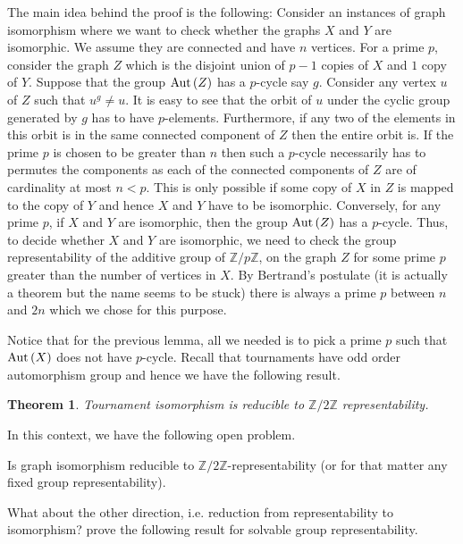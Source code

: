 \documentclass{article}
\newtheorem{theorem}{Theorem}[section]
\begin{document}
The main idea behind the proof is the following: Consider an instances
of graph isomorphism where we want to check whether the graphs $X$ and
$Y$ are isomorphic. We assume they are connected and have $n$
vertices. For a prime $p$, consider the graph $Z$ which is the
disjoint union of $p-1$ copies of $X$ and $1$ copy of $Y$. Suppose
that the group $\mathrm{Aut}\left(Z\right)$ has a $p$-cycle say $g$. Consider any vertex
$u$ of $Z$ such that $u^g \neq u$. It is easy to see that the orbit of
$u$ under the cyclic group generated by $g$ has to have $p$-elements.
Furthermore, if any two of the elements in this orbit is in the same
connected component of $Z$ then the entire orbit is. If the prime $p$
is chosen to be greater than $n$ then such a $p$-cycle necessarily
has to permutes the components as each of the connected components of
$Z$ are of cardinality at most $n < p$. This is only possible if some
copy of $X$ in $Z$ is mapped to the copy of $Y$ and hence $X$ and $Y$
have to be isomorphic. Conversely, for any prime $p$, if $X$ and $Y$
are isomorphic, then the group $\mathrm{Aut}\left(Z\right)$ has a $p$-cycle. Thus, to
decide whether $X$ and $Y$ are isomorphic, we need to check the group
representability of the additive group of $\mathbb{Z}/p\mathbb{Z}$, on
the graph $Z$ for some prime $p$ greater than the number of vertices
in $X$. By Bertrand's postulate (it is actually a theorem but the name
seems to be stuck) there is always a prime $p$ between $n$ and $2n$
which we chose for this purpose.

Notice that for the previous lemma, all we needed is to pick a prime
$p$ such that $\mathrm{Aut}\left(X\right)$ does not have $p$-cycle.  Recall that
tournaments have odd order automorphism group and hence we have the
following result.

\begin{theorem}
  Tournament isomorphism is reducible to $\mathbb{Z}/2\mathbb{Z}$
  representability.
\end{theorem}

In this context, we have the following open problem.

\begin{openproblem}
  Is graph isomorphism reducible to
  $\mathbb{Z}/2\mathbb{Z}$-representability (or for that matter any
  fixed group representability).
\end{openproblem}

What about the other direction, i.e. reduction from representability
to isomorphism? \citet{kurur09} prove the following result for
solvable group representability.
\end{document}
